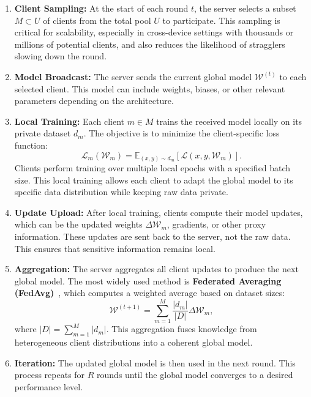 \documentclass[11pt]{report}
\begin{document}
\begin{enumerate}
  \item \textbf{Client Sampling:}
        At the start of each round $t$, the server selects a subset $M \subset U$ of clients from the total pool $U$ to participate. This sampling is critical for scalability, especially in cross-device settings with thousands or millions of potential clients, and also reduces the likelihood of stragglers slowing down the round.

  \item \textbf{Model Broadcast:}
        The server sends the current global model $\mathcal{W}^{(t)}$ to each selected client. This model can include weights, biases, or other relevant parameters depending on the architecture.

  \item \textbf{Local Training:}
        Each client $m \in M$ trains the received model locally on its private dataset $d_m$. The objective is to minimize the client-specific loss function:
        \begin{equation}
          \mathcal{L}_m(\mathcal{W}_m) = \mathbb{E}_{(x,y)\sim d_m}[\mathcal{L}(x,y,\mathcal{W}_m)].
        \end{equation}
        Clients perform training over multiple local epochs with a specified batch size. This local training allows each client to adapt the global model to its specific data distribution while keeping raw data private.

  \item \textbf{Update Upload:}
        After local training, clients compute their model updates, which can be the updated weights $\Delta \mathcal{W}_m$, gradients, or other proxy information. These updates are sent back to the server, not the raw data. This ensures that sensitive information remains local.

  \item \textbf{Aggregation:}
        The server aggregates all client updates to produce the next global model. The most widely used method is \textbf{Federated Averaging (FedAvg)}~\cite{mcmahan2017communication}, which computes a weighted average based on dataset sizes:
        \begin{equation}
          \mathcal{W}^{(t+1)} = \sum_{m=1}^{M} \frac{|d_m|}{|D|} \Delta \mathcal{W}_m,
        \end{equation}
        where $|D| = \sum_{m=1}^{M} |d_m|$. This aggregation fuses knowledge from heterogeneous client distributions into a coherent global model.

  \item \textbf{Iteration:}
        The updated global model is then used in the next round. This process repeats for $R$ rounds until the global model converges to a desired performance level.
\end{enumerate}
\end{document}
